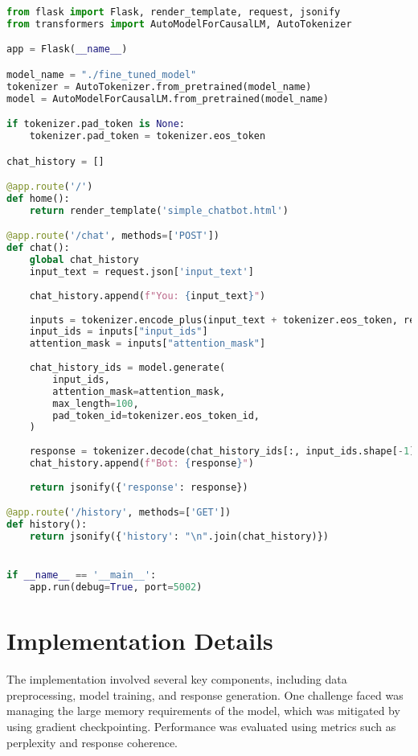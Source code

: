 \documentclass[12pt]{article}
\begin{document}
\begin{lstlisting}[language=Python, caption=Flask Code for Web Interface]
from flask import Flask, render_template, request, jsonify
from transformers import AutoModelForCausalLM, AutoTokenizer

app = Flask(__name__)

model_name = "./fine_tuned_model"
tokenizer = AutoTokenizer.from_pretrained(model_name)
model = AutoModelForCausalLM.from_pretrained(model_name)

if tokenizer.pad_token is None:
    tokenizer.pad_token = tokenizer.eos_token

chat_history = []

@app.route('/')
def home():
    return render_template('simple_chatbot.html')

@app.route('/chat', methods=['POST'])
def chat():
    global chat_history
    input_text = request.json['input_text']
    
    chat_history.append(f"You: {input_text}")
    
    inputs = tokenizer.encode_plus(input_text + tokenizer.eos_token, return_tensors="pt", padding=True)
    input_ids = inputs["input_ids"]
    attention_mask = inputs["attention_mask"]
    
    chat_history_ids = model.generate(
        input_ids,
        attention_mask=attention_mask,
        max_length=100,
        pad_token_id=tokenizer.eos_token_id,
    )
    
    response = tokenizer.decode(chat_history_ids[:, input_ids.shape[-1]:][0], skip_special_tokens=True)
    chat_history.append(f"Bot: {response}")
    
    return jsonify({'response': response})

@app.route('/history', methods=['GET'])
def history():
    return jsonify({'history': "\n".join(chat_history)})


if __name__ == '__main__':
    app.run(debug=True, port=5002)
\end{lstlisting}

\section{Implementation Details}
The implementation involved several key components, including data preprocessing, model training, and response generation. One challenge faced was managing the large memory requirements of the model, which was mitigated by using gradient checkpointing. Performance was evaluated using metrics such as perplexity and response coherence.
\end{document}
